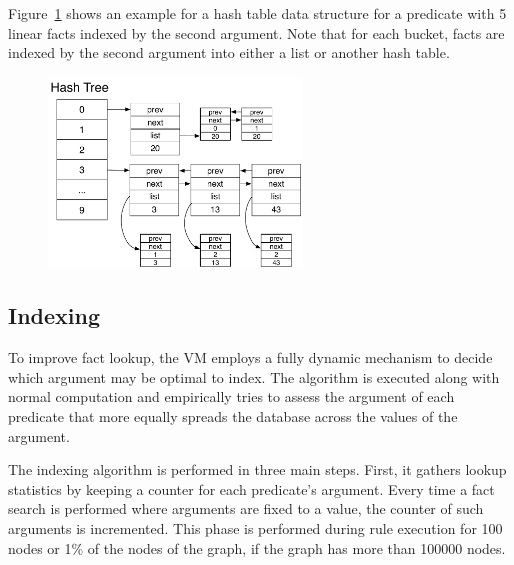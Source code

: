 Figure~\ref{fig:implementation:hash_table} shows an example for a hash table
data structure for a  predicate with 5 linear facts indexed by
the second argument. Note that for each bucket, facts are indexed by the second
argument into either a list or another hash table.

\begin{figure}[ht]
   \centering
   \includegraphics[width=0.6\textwidth]{figures/implementation/hash_table.pdf}


   \label{fig:implementation:hash_table}
\end{figure}


\subsection{Indexing}\label{sec:implementation:indexing}

To improve fact lookup, the VM employs a fully dynamic mechanism to
decide which argument may be optimal to index.  The algorithm is
executed along with normal computation and empirically tries to
assess the argument of each predicate that more equally spreads the
database across the values of the argument. 

The indexing algorithm is performed in three main steps. First, it gathers
lookup statistics by keeping a counter for each predicate's argument. Every time
a fact search is performed where arguments are fixed to a value, the counter of
such arguments is incremented. This phase is performed during rule execution for
100 nodes or 1\% of the nodes of the graph, if the graph has more than 100000
nodes.

